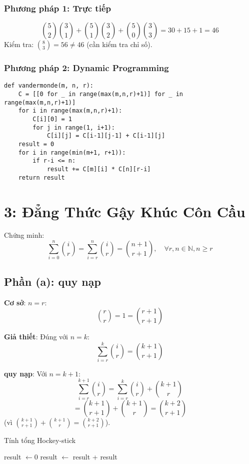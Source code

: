 \documentclass[a4paper,12pt]{article}
\theoremstyle{plain}
\theoremstyle{definition}
\begin{document}
\subsubsection*{Phương pháp 1: Trực tiếp}
\[
\binom{5}{2}\binom{3}{1} + \binom{5}{1}\binom{3}{2} + \binom{5}{0}\binom{3}{3} = 30 + 15 + 1 = 46
\]
Kiểm tra: \( \binom{8}{3} = 56 \neq 46 \) (cần kiểm tra chỉ số).

\subsubsection*{Phương pháp 2: Dynamic Programming}
\begin{verbatim}
def vandermonde(m, n, r):
    C = [[0 for _ in range(max(m,n,r)+1)] for _ in range(max(m,n,r)+1)]
    for i in range(max(m,n,r)+1):
        C[i][0] = 1
        for j in range(1, i+1):
            C[i][j] = C[i-1][j-1] + C[i-1][j]
    result = 0
    for i in range(min(m+1, r+1)):
        if r-i <= n:
            result += C[m][i] * C[n][r-i]
    return result
\end{verbatim}

\section*{3: Đẳng Thức Gậy Khúc Côn Cầu}

Chứng minh:
\[
\sum_{i=0}^n \binom{i}{r} = \sum_{i=r}^n \binom{i}{r} = \binom{n+1}{r+1}, \quad \forall r,n \in \mathbb{N}, n \geq r
\]

\subsection*{Phần (a): quy nạp}

\textbf{Cơ sở}: \( n = r \):
\[
\binom{r}{r} = 1 = \binom{r+1}{r+1}
\]

\textbf{Giả thiết}: Đúng với \( n = k \):
\[
\sum_{i=r}^k \binom{i}{r} = \binom{k+1}{r+1}
\]

\textbf{quy nạp}: Với \( n = k+1 \):
\[
\sum_{i=r}^{k+1} \binom{i}{r} = \sum_{i=r}^k \binom{i}{r} + \binom{k+1}{r}
\]
\[
= \binom{k+1}{r+1} + \binom{k+1}{r} = \binom{k+2}{r+1}
\]
(vì \( \binom{k+1}{r+1} + \binom{k+1}{r} = \binom{k+2}{r+1} \)).

\begin{algorithm}
\caption{Tính tổng Hockey-stick}
\begin{algorithmic}
    \State result $\gets 0$
        \State result $\gets$ result + 
    \EndFor
    \State \Return result
\EndFunction
\end{algorithmic}
\end{algorithm}
\end{document}
